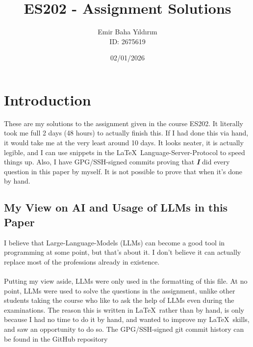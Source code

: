 \documentclass{article}
\author{Emir Baha Yıldırım\\ID: 2675619}
\title{ES202 - Assignment Solutions}
\date{02/01/2026}
\begin{document}
\maketitle

\pagebreak

\tableofcontents

\pagebreak

\section{Introduction}
These are my solutions to the assignment given in the course ES202. It literally
took me full 2 days (48 hours) to actually finish this. If I had done this via
hand, it would take me at the very least around 10 days. It looks neater, it is
actually legible, and I can use snippets in the \LaTeX \
Language-Server-Protocol to speed things up. Also, I have GPG/SSH-signed commits
proving that \textbf{\textit{I}} did every question in this paper by myself. It
is not possible to prove that when it's done by hand.
\subsection{My View on AI and Usage of LLMs in this Paper}
I believe that Large-Language-Models (LLMs) can become a good tool in
programming at some point, but that's about it. I don't believe it can actually
replace most of the professions already in existence.
\\
\\
Putting my view aside, LLMs were only used in the formatting of this file. At no
point, LLMs were used to solve the questions in the assignment, unlike other
students taking the course who like to ask the help of LLMs even during the
examinations. The reason this is written in \LaTeX \ rather than by hand, is
only because I had no time to do it by hand, and wanted to improve my \LaTeX \
skills, and saw an opportunity to do so. The GPG/SSH-signed git commit history
can be found in the GitHub repository
\end{document}
